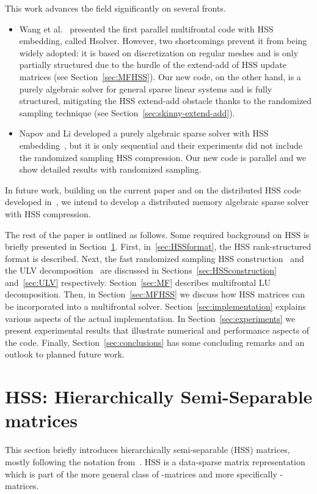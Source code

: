 \documentclass{article}
\begin{document}
This work advances the field significantly on several fronts.
\begin{itemize}
\item Wang et al.~\cite{wang2014parallel} presented the first parallel
  multifrontal code with HSS embedding, called Hsolver. However, two
  shortcomings prevent it from being widely adopted: it is based on
  discretization on regular meshes and is only partially structured
  due to the hurdle of the extend-add of HSS update matrices (see
  Section~\ref{sec:MFHSS}).  Our new code, on the other hand, is a
  purely algebraic solver for general sparse linear systems and is
  fully structured, mitigating the HSS extend-add obstacle thanks to
  the randomized sampling technique (see
  Section~\ref{sec:skinny-extend-add}).
\item 
Napov and Li developed a purely algebraic sparse solver with HSS
  embedding~\cite{napov2013algebraic}, but it is only sequential and
  their experiments did not include the randomized sampling HSS
  compression.  Our new code is parallel and we show detailed results
  with randomized sampling.
\end{itemize}
In future work, building on the current paper and on the distributed
HSS code developed in~\cite{FHR}, we intend to develop a distributed
memory algebraic sparse solver with HSS compression.

The rest of the paper is outlined as follows.  Some required
background on HSS is briefly presented in
Section~\ref{sec:HSS}. First, in~\ref{sec:HSSformat}, the HSS
rank-structured format is described. Next, the fast randomized
sampling HSS construction~\cite{martinsson2011fast} and the ULV
decomposition~\cite{xia2012superfast} are discussed in
Sections~\ref{sec:HSSconstruction} and~\ref{sec:ULV} respectively.
Section~\ref{sec:MF} describes multifrontal LU decomposition. Then, in
Section~\ref{sec:MFHSS} we discuss how HSS matrices can be
incorporated into a multifrontal
solver. Section~\ref{sec:implementation} explains various aspects of
the actual implementation. In Section~\ref{sec:experiments} we present
experimental results that illustrate numerical and performance aspects
of the code. Finally, Section~\ref{sec:conclusions} has some
concluding remarks and an outlook to planned future work.


\section{HSS: Hierarchically Semi-Separable matrices}\label{sec:HSS}
This section briefly introduces hierarchically semi-separable (HSS)
matrices, mostly following the notation
from~\cite{martinsson2011fast}. HSS is a data-sparse matrix
representation which is part of the more general class of
-matrices and more specifically -matrices.
\end{document}
